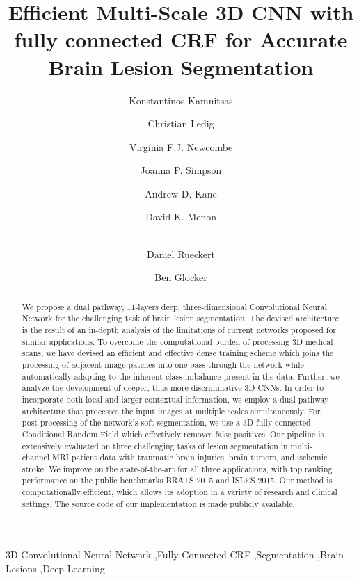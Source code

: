 \documentclass[preprint,authoryear,12pt]{elsarticle}
\begin{document}
\begin{frontmatter}

\title{Efficient Multi-Scale 3D CNN with fully connected CRF for Accurate Brain Lesion Segmentation}

\author[ICL]{Konstantinos Kamnitsas}
\author[ICL]{Christian Ledig}
\author[UDA,WB]{Virginia F.J. Newcombe}
\author[UDA]{Joanna P. Simpson}
\author[UDA]{Andrew D. Kane}
\author[UDA,WB]{David K. Menon}
\author[ICL]{\\Daniel Rueckert}
\author[ICL]{Ben Glocker}

\address[ICL]{Biomedical Image Analysis Group, Imperial College London, UK}
\address[UDA]{University Division of Anaesthesia, Department of Medicine, Cambridge University, UK}
\address[WB]{Wolfson Brain Imaging Centre, Cambridge University, UK}

\begin{abstract}
We propose a dual pathway, 11-layers deep, three-dimensional Convolutional Neural Network for the challenging task of brain lesion segmentation. The devised architecture is the result of an in-depth analysis of the limitations of current networks proposed for similar applications. To overcome the computational burden of processing 3D medical scans, we have devised an efficient and effective dense training scheme which joins the processing of adjacent image patches into one pass through the network while automatically adapting to the inherent class imbalance present in the data. Further, we analyze the development of deeper, thus more discriminative 3D CNNs. In order to incorporate both local and larger contextual information, we employ a dual pathway architecture that processes the input images at multiple scales simultaneously. For post-processing of the network's soft segmentation, we use a 3D fully connected Conditional Random Field which effectively removes false positives. Our pipeline is extensively evaluated on three challenging tasks of lesion segmentation in multi-channel MRI patient data with traumatic brain injuries, brain tumors, and ischemic stroke. We improve on the state-of-the-art for all three applications, with top ranking performance on the public benchmarks BRATS 2015 and ISLES 2015. Our method is computationally efficient, which allows its adoption in a variety of research and clinical settings. The source code of our implementation is made publicly available.
\end{abstract}

\begin{keyword}
3D Convolutional Neural Network \sep Fully Connected CRF \sep Segmentation \sep Brain Lesions \sep Deep Learning
\end{keyword}

\end{frontmatter}
\end{document}
